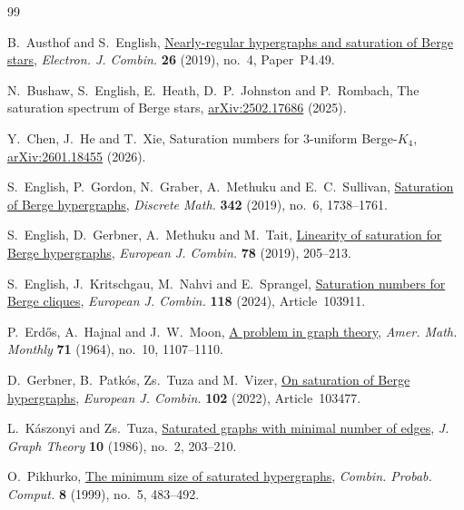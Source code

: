 \documentclass[11pt,a4paper]{article}
\numberwithin{equation}{section}
\theoremstyle{definition}
\theoremstyle{plain}
\begin{document}
\begin{thebibliography}{99}

B.~Austhof and S.~English,
\newblock \href{https://doi.org/10.37236/8363}{Nearly-regular hypergraphs and saturation of Berge stars},
\newblock \emph{Electron. J. Combin.} \textbf{26} (2019), no.~4,
Paper~P4.49.

N.~Bushaw, S.~English, E.~Heath, D.~P.~Johnston and P.~Rombach,
\newblock The saturation spectrum of Berge stars,
\newblock \href{https://arxiv.org/abs/2502.17686}{arXiv:2502.17686} (2025).

Y.~Chen, J.~He and T.~Xie,
\newblock Saturation numbers for $3$-uniform Berge-$K_4$,
\newblock \href{https://arxiv.org/abs/2601.18455}{arXiv:2601.18455} (2026).

S.~English, P.~Gordon, N.~Graber, A.~Methuku and E.~C.~Sullivan,
\newblock \href{https://doi.org/10.1016/j.disc.2019.01.031}{Saturation of Berge hypergraphs},
\newblock \emph{Discrete Math.} \textbf{342} (2019), no.~6, 1738--1761.

S.~English, D.~Gerbner, A.~Methuku and M.~Tait,
\newblock \href{https://doi.org/10.1016/j.ejc.2019.02.002}{Linearity of saturation for Berge hypergraphs},
\newblock \emph{European J. Combin.} \textbf{78} (2019), 205--213.

S.~English, J.~Kritschgau, M.~Nahvi and E.~Sprangel,
\newblock \href{https://doi.org/10.1016/j.ejc.2023.103911}{Saturation numbers for Berge cliques},
\newblock \emph{European J. Combin.} \textbf{118} (2024), Article~103911.

P.~Erd\H{o}s, A.~Hajnal and J.~W.~Moon,
\newblock \href{https://doi.org/10.2307/2311408}{A problem in graph theory},
\newblock \emph{Amer. Math. Monthly} \textbf{71} (1964), no.~10, 1107--1110.

D.~Gerbner, B.~Patk\'os, Zs.~Tuza and M.~Vizer,
\newblock \href{https://doi.org/10.1016/j.ejc.2021.103477}{On saturation of Berge hypergraphs},
\newblock \emph{European J. Combin.} \textbf{102} (2022), Article~103477.

L.~K\'aszonyi and Zs.~Tuza,
\newblock \href{https://doi.org/10.1002/jgt.3190100209}{Saturated graphs with minimal number of edges},
\newblock \emph{J. Graph Theory} \textbf{10} (1986), no.~2, 203--210.

O.~Pikhurko,
\newblock \href{https://doi.org/10.1017/S0963548399003971}{The minimum size of saturated hypergraphs},
\newblock \emph{Combin. Probab. Comput.} \textbf{8} (1999), no.~5, 483--492.

\end{thebibliography}
\end{document}

